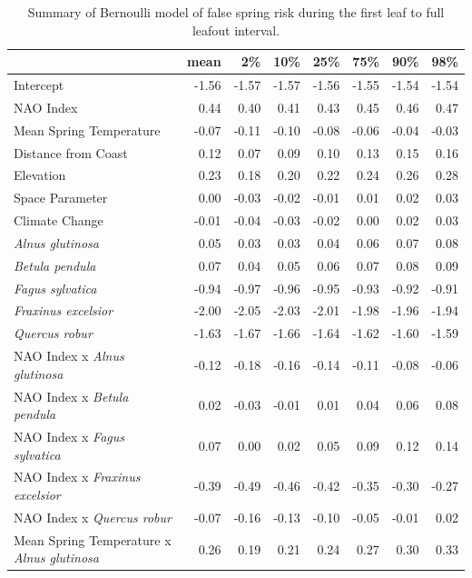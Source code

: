 \documentclass{article}\usepackage[]{graphicx}\usepackage[]{color}
\begin{document}
\newpage
\begin{longtable}{lrrrrrrr}
\caption{Summary of Bernoulli model of false spring risk during the first leaf to full leafout interval.} \\ 
  \hline
 & mean & 2\% & 10\% & 25\% & 75\% & 90\% & 98\% \\ 
  \hline \endhead  \hline
Intercept & -1.56 & -1.57 & -1.57 & -1.56 & -1.55 & -1.54 & -1.54 \\ 
  NAO Index & 0.44 & 0.40 & 0.41 & 0.43 & 0.45 & 0.46 & 0.47 \\ 
  Mean Spring 
Temperature & -0.07 & -0.11 & -0.10 & -0.08 & -0.06 & -0.04 & -0.03 \\ 
  Distance from 
Coast & 0.12 & 0.07 & 0.09 & 0.10 & 0.13 & 0.15 & 0.16 \\ 
  Elevation & 0.23 & 0.18 & 0.20 & 0.22 & 0.24 & 0.26 & 0.28 \\ 
  Space Parameter & 0.00 & -0.03 & -0.02 & -0.01 & 0.01 & 0.02 & 0.03 \\ 
  Climate Change & -0.01 & -0.04 & -0.03 & -0.02 & 0.00 & 0.02 & 0.03 \\ 
  \textit{Alnus glutinosa} & 0.05 & 0.03 & 0.03 & 0.04 & 0.06 & 0.07 & 0.08 \\ 
  \textit{Betula pendula} & 0.07 & 0.04 & 0.05 & 0.06 & 0.07 & 0.08 & 0.09 \\ 
  \textit{Fagus sylvatica} & -0.94 & -0.97 & -0.96 & -0.95 & -0.93 & -0.92 & -0.91 \\ 
  \textit{Fraxinus excelsior} & -2.00 & -2.05 & -2.03 & -2.01 & -1.98 & -1.96 & -1.94 \\ 
  \textit{Quercus robur} & -1.63 & -1.67 & -1.66 & -1.64 & -1.62 & -1.60 & -1.59 \\ 
  NAO Index
x\textit{ Alnus glutinosa} & -0.12 & -0.18 & -0.16 & -0.14 & -0.11 & -0.08 & -0.06 \\ 
  NAO Index
x\textit{ Betula pendula} & 0.02 & -0.03 & -0.01 & 0.01 & 0.04 & 0.06 & 0.08 \\ 
  NAO Index
x\textit{ Fagus sylvatica} & 0.07 & 0.00 & 0.02 & 0.05 & 0.09 & 0.12 & 0.14 \\ 
  NAO Index
x\textit{ Fraxinus excelsior} & -0.39 & -0.49 & -0.46 & -0.42 & -0.35 & -0.30 & -0.27 \\ 
  NAO Index
x\textit{ Quercus robur} & -0.07 & -0.16 & -0.13 & -0.10 & -0.05 & -0.01 & 0.02 \\ 
  Mean Spring 
Temperature
x\textit{ Alnus glutinosa} & 0.26 & 0.19 & 0.21 & 0.24 & 0.27 & 0.30 & 0.33 \\ 

\end{longtable}
\end{document}
